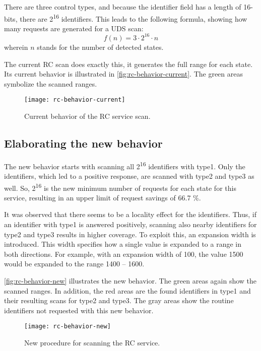 There are three control types, and because the identifier field has a length of 16-bits, there are 2\textsuperscript{16} identifiers. This leads to the following formula, showing how many requests are generated for a UDS scan:
\[f(n)=3 \cdot 2^{16} \cdot n\]
wherein $n$ stands for the number of detected states.

The current RC scan does exactly this, it generates the full range for each state. Its current behavior is illustrated in \autoref{fig:rc-behavior-current}. The green areas symbolize the scanned ranges.

\begin{figure}[htb]
    \centering
    \texttt{[image: rc-behavior-current]}
    \caption{Current behavior of the RC service scan.}
    \label{fig:rc-behavior-current}
\end{figure}

\subsection{Elaborating the new behavior}
\label{subsubsec:rc-elaborating}

The new behavior starts with scanning all 2\textsuperscript{16} identifiers with type1. Only the identifiers, which led to a positive response, are scanned with type2 and type3 as well. So, 2\textsuperscript{16} is the new minimum number of requests for each state for this service, resulting in an upper limit of request savings of 66.7 \%.

It was observed that there seems to be a locality effect for the identifiers. Thus, if an identifier with type1 is answered positively, scanning also nearby identifiers for type2 and type3 results in higher coverage. To exploit this, an expansion width is introduced. This width specifies how a single value is expanded to a range in both directions. For example, with an expansion width of 100, the value 1500 would be expanded to the range 1400 – 1600.

\autoref{fig:rc-behavior-new} illustrates the new behavior. The green areas again show the scanned ranges. In addition, the red areas are the found identifiers in type1 and their resulting scans for type2 and type3. The gray areas show the routine identifiers not requested with this new behavior.

\begin{figure}[htb]
    \centering
    \texttt{[image: rc-behavior-new]}
    \caption{New procedure for scanning the RC service.}
    \label{fig:rc-behavior-new}
\end{figure}

